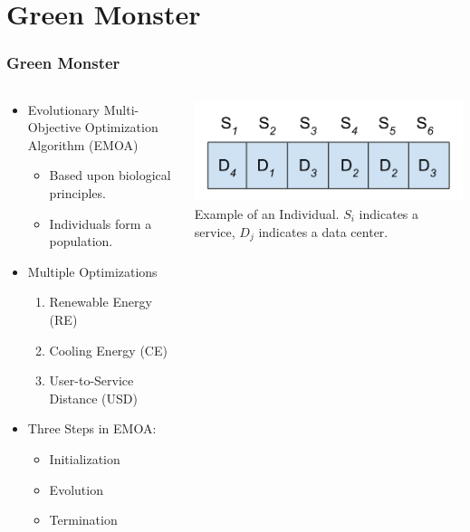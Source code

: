 \documentclass{beamer}
\begin{document}
\section[Green Monster]{Green Monster}
\begin{frame}
  \frametitle{Green Monster}
\begin{columns}
\begin{column}{0.65\textwidth}
  \begin{itemize}
 		\item Evolutionary Multi-Objective Optimization Algorithm (EMOA)
 		\begin{itemize}
 			\item Based upon biological principles.
 			\item Individuals form a population.
 		\end{itemize}
	\item Multiple Optimizations
 		\begin{enumerate}
			\item Renewable Energy (RE)
			\item Cooling Energy (CE)
			\item User-to-Service Distance (USD)
		\end{enumerate}
	\item Three Steps in EMOA: 
		\begin{itemize}
			\item Initialization
			\item Evolution
			\item Termination
		\end{itemize}
  \end{itemize}
\end{column}
\begin{column}{0.35\textwidth}
\includegraphics[width=.95\textwidth]{Individual.png} \\
\tiny{Example of an Individual. $S_i$ indicates a service, $D_j$ indicates a data center.}
\end{column}
\end{columns}


\end{frame}
 	
\end{document}
